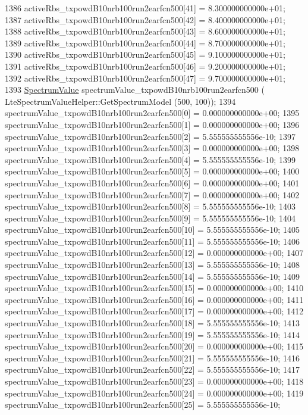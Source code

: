 \begin{DoxyCode}
1386   activeRbs\_txpowdB10nrb100run2earfcn500[41] = 8.300000000000e+01;
1387   activeRbs\_txpowdB10nrb100run2earfcn500[42] = 8.400000000000e+01;
1388   activeRbs\_txpowdB10nrb100run2earfcn500[43] = 8.600000000000e+01;
1389   activeRbs\_txpowdB10nrb100run2earfcn500[44] = 8.700000000000e+01;
1390   activeRbs\_txpowdB10nrb100run2earfcn500[45] = 9.100000000000e+01;
1391   activeRbs\_txpowdB10nrb100run2earfcn500[46] = 9.200000000000e+01;
1392   activeRbs\_txpowdB10nrb100run2earfcn500[47] = 9.700000000000e+01;
1393   \hyperlink{classns3_1_1SpectrumValue}{SpectrumValue} spectrumValue\_txpowdB10nrb100run2earfcn500 (
      LteSpectrumValueHelper::GetSpectrumModel (500, 100));
1394   spectrumValue\_txpowdB10nrb100run2earfcn500[0] = 0.000000000000e+00;
1395   spectrumValue\_txpowdB10nrb100run2earfcn500[1] = 0.000000000000e+00;
1396   spectrumValue\_txpowdB10nrb100run2earfcn500[2] = 5.555555555556e-10;
1397   spectrumValue\_txpowdB10nrb100run2earfcn500[3] = 0.000000000000e+00;
1398   spectrumValue\_txpowdB10nrb100run2earfcn500[4] = 5.555555555556e-10;
1399   spectrumValue\_txpowdB10nrb100run2earfcn500[5] = 0.000000000000e+00;
1400   spectrumValue\_txpowdB10nrb100run2earfcn500[6] = 0.000000000000e+00;
1401   spectrumValue\_txpowdB10nrb100run2earfcn500[7] = 0.000000000000e+00;
1402   spectrumValue\_txpowdB10nrb100run2earfcn500[8] = 5.555555555556e-10;
1403   spectrumValue\_txpowdB10nrb100run2earfcn500[9] = 5.555555555556e-10;
1404   spectrumValue\_txpowdB10nrb100run2earfcn500[10] = 5.555555555556e-10;
1405   spectrumValue\_txpowdB10nrb100run2earfcn500[11] = 5.555555555556e-10;
1406   spectrumValue\_txpowdB10nrb100run2earfcn500[12] = 0.000000000000e+00;
1407   spectrumValue\_txpowdB10nrb100run2earfcn500[13] = 5.555555555556e-10;
1408   spectrumValue\_txpowdB10nrb100run2earfcn500[14] = 5.555555555556e-10;
1409   spectrumValue\_txpowdB10nrb100run2earfcn500[15] = 0.000000000000e+00;
1410   spectrumValue\_txpowdB10nrb100run2earfcn500[16] = 0.000000000000e+00;
1411   spectrumValue\_txpowdB10nrb100run2earfcn500[17] = 0.000000000000e+00;
1412   spectrumValue\_txpowdB10nrb100run2earfcn500[18] = 5.555555555556e-10;
1413   spectrumValue\_txpowdB10nrb100run2earfcn500[19] = 5.555555555556e-10;
1414   spectrumValue\_txpowdB10nrb100run2earfcn500[20] = 0.000000000000e+00;
1415   spectrumValue\_txpowdB10nrb100run2earfcn500[21] = 5.555555555556e-10;
1416   spectrumValue\_txpowdB10nrb100run2earfcn500[22] = 5.555555555556e-10;
1417   spectrumValue\_txpowdB10nrb100run2earfcn500[23] = 0.000000000000e+00;
1418   spectrumValue\_txpowdB10nrb100run2earfcn500[24] = 0.000000000000e+00;
1419   spectrumValue\_txpowdB10nrb100run2earfcn500[25] = 5.555555555556e-10;

\end{DoxyCode}
